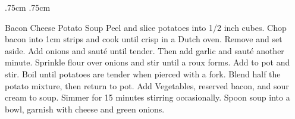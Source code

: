 \documentclass[]{article}
\title{}
\author{}
\begin{document}
\RecipeWidths{\textwidth}{3cm}{0.5cm}{5cm} {.75cm} {.75cm}
\begin{recipe}{Bacon Cheese Potato Soup}{}{}
	Peel and slice potatoes into 1/2 inch cubes. 
	Chop bacon into 1cm strips and cook until crisp in a Dutch oven. Remove and set aside. 
	Add onions and sauté until tender. 
	Then add garlic and sauté another minute.
	Sprinkle flour over onions and stir until a roux forms. 
	Add to pot and stir. Boil until potatoes are tender when pierced with a fork. Blend half the potato mixture, then return to pot. 
	Add Vegetables, reserved bacon, and sour cream to soup. Simmer for 15 minutes stirring occasionally. 
	Spoon soup into a bowl, garnish with cheese and green onions. 
\end{recipe}
\end{document}
